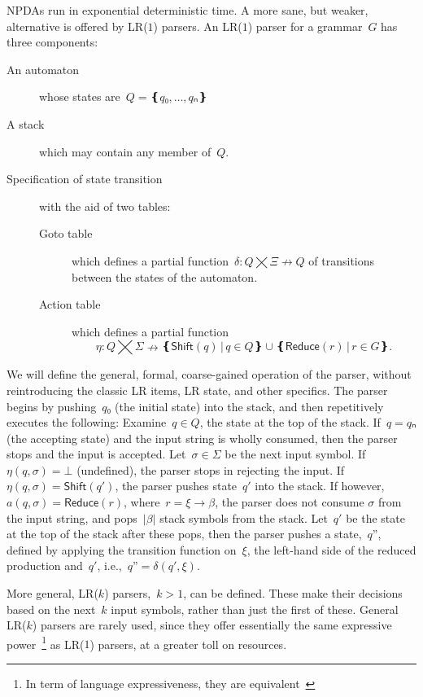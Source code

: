 NPDAs run in exponential deterministic time.
A more sane, but weaker, alternative is offered by LR($1$) parsers.
An LR($1$) parser for a grammar~$G$ has three components:
\begin{description}
  \item[An automaton] whose states are~$Q=❴q₀,…,qₙ❵$
  \item[A stack] which may contain any member of~$Q$.
  \item[Specification of state transition] with the aid of two tables:
        \begin{description}
          \item[Goto table] which defines a partial function~$δ:Q⨉Ξ↛Q$ of transitions
          between the states of the automaton.
          \item[Action table] which
            defines a partial function\[η:Q⨉Σ↛ ❴ \textsf{Shift}(q) \,|\, q∈Q❵ ∪ ❴\textsf{Reduce}(r) \,| \, r∈G❵.\]
        \end{description}
\end{description}
We will define the general, formal, coarse-gained operation of the parser, without reintroducing 
  the classic LR items, LR state, and other specifics.
The parser begins by pushing~$q₀$ (the initial state) into the stack,
and then repetitively executes the following:
Examine~$q∈Q$, the state at the top of the stack.
If~$q=qₙ$ (the accepting state) and the input string is wholly consumed, then the parser stops and the input is accepted.
Let~$σ∈Σ$ be the next input symbol.
If~$η(q,σ)=⊥$ (undefined), the parser stops in rejecting the input.
If~$η(q,σ) = \textsf{Shift}(q')$, the parser pushes state~$q'$ into the stack.
If however,~$a(q,σ) = \textsf{Reduce}(r)$,
where~$r=ξ→β$, the parser does not consume $\sigma$ from the input string,
  and pops~$|β|$ stack symbols from the stack.
Let~$q'$ be the state at the top of the stack after these pops, then
  the parser pushes a state,~$q”$,
  defined by applying the transition function on~$ξ$, the left-hand side of the reduced production and~$q'$, i.e.,~$q”=δ(q',ξ)$.

More general, LR($k$) parsers,~$k>1$, can be defined. These make their
  decisions based on the next~$k$ input symbols, rather than just the first of these.
  General LR($k$) parsers are rarely used, since they offer essentially 
    the same expressive power~\footnote{In term of language expressiveness, they are equivalent~\cite{Knuth:65}} as LR($1$) parsers, at a greater toll on resources.

